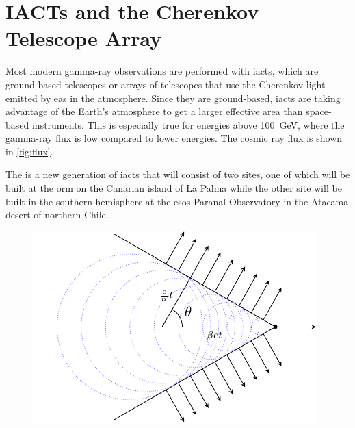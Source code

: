 \chapter{IACTs and the Cherenkov Telescope Array}

Most modern gamma-ray observations are performed with \glspl{iact}, which are ground-based telescopes
or arrays of telescopes that use the Cherenkov light emitted by \gls{eas} in the atmosphere.
Since they are ground-based, \glspl{iact} are taking advantage of the Earth's atmosphere to get a larger
effective area than space-based instruments. This is especially true for energies above \SI{100}{\giga\eV},
 where the gamma-ray flux is low compared to lower energies. The cosmic ray flux
is shown in \autoref{fig:flux}.

%     

The \cta{} is a new generation of \glspl{iact} that will consist of two sites,
one of which will be built at the \gls{orm} on the Canarian island of La Palma while the other site
will be built in the southern hemisphere at the \glspl{eso} Paranal Observatory in the Atacama desert
of northern Chile.

\begin{figure}
    \centering
    \includegraphics[width=\textwidth]{graphics/cherenkov_radiation.pdf}
    \caption{}
    \label{fig:cherenkov}
\end{figure}